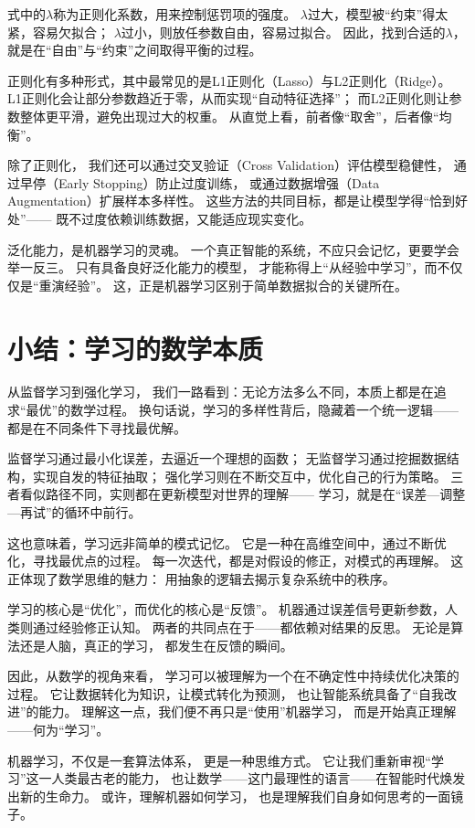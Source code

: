 式中的$\lambda$称为正则化系数，用来控制惩罚项的强度。  
$\lambda$过大，模型被“约束”得太紧，容易欠拟合；  
$\lambda$过小，则放任参数自由，容易过拟合。  
因此，找到合适的$\lambda$，  
就是在“自由”与“约束”之间取得平衡的过程。



正则化有多种形式，其中最常见的是L1正则化（Lasso）与L2正则化（Ridge）。  
L1正则化会让部分参数趋近于零，从而实现“自动特征选择”；  
而L2正则化则让参数整体更平滑，避免出现过大的权重。  
从直觉上看，前者像“取舍”，后者像“均衡”。



除了正则化，  
我们还可以通过交叉验证（Cross Validation）评估模型稳健性，  
通过早停（Early Stopping）防止过度训练，  
或通过数据增强（Data Augmentation）扩展样本多样性。  
这些方法的共同目标，都是让模型学得“恰到好处”——  
既不过度依赖训练数据，又能适应现实变化。



泛化能力，是机器学习的灵魂。  
一个真正智能的系统，不应只会记忆，更要学会举一反三。  
只有具备良好泛化能力的模型，  
才能称得上“从经验中学习”，而不仅仅是“重演经验”。  
这，正是机器学习区别于简单数据拟合的关键所在。

\section{小结：学习的数学本质}

从监督学习到强化学习，  
我们一路看到：无论方法多么不同，本质上都是在追求“最优”的数学过程。  
换句话说，学习的多样性背后，隐藏着一个统一逻辑——  
都是在不同条件下寻找最优解。



监督学习通过最小化误差，去逼近一个理想的函数；  
无监督学习通过挖掘数据结构，实现自发的特征抽取；  
强化学习则在不断交互中，优化自己的行为策略。  
三者看似路径不同，实则都在更新模型对世界的理解——  
学习，就是在“误差—调整—再试”的循环中前行。



这也意味着，学习远非简单的模式记忆。  
它是一种在高维空间中，通过不断优化，寻找最优点的过程。  
每一次迭代，都是对假设的修正，对模式的再理解。  
这正体现了数学思维的魅力：  
用抽象的逻辑去揭示复杂系统中的秩序。



学习的核心是“优化”，而优化的核心是“反馈”。  
机器通过误差信号更新参数，人类则通过经验修正认知。  
两者的共同点在于——都依赖对结果的反思。  
无论是算法还是人脑，真正的学习，  
都发生在反馈的瞬间。



因此，从数学的视角来看，  
学习可以被理解为一个在不确定性中持续优化决策的过程。  
它让数据转化为知识，让模式转化为预测，  
也让智能系统具备了“自我改进”的能力。  
理解这一点，我们便不再只是“使用”机器学习，  
而是开始真正理解——何为“学习”。



机器学习，不仅是一套算法体系，  
更是一种思维方式。  
它让我们重新审视“学习”这一人类最古老的能力，  
也让数学——这门最理性的语言——在智能时代焕发出新的生命力。  
或许，理解机器如何学习，  
也是理解我们自身如何思考的一面镜子。

\nocite{*}
\newpage
